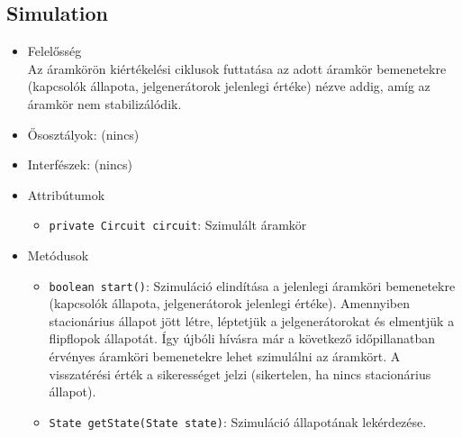 \subsection{Simulation}
\begin{itemize}
\item Felelősség\\
Az áramkörön kiértékelési ciklusok futtatása az adott áramkör bemenetekre (kapcsolók állapota, jelgenerátorok jelenlegi értéke) nézve addig, amíg az áramkör nem stabilizálódik.
\item Ősosztályok: (nincs)
\item Interfészek: (nincs)
\item Attribútumok $\ $
\begin{itemize}
	\item \texttt{private Circuit circuit}: Szimulált áramkör
\end{itemize}
\item Metódusok$\ $
\begin{itemize}
	\item \texttt{boolean start()}: Szimuláció elindítása a jelenlegi áramköri bemenetekre (kapcsolók állapota, jelgenerátorok jelenlegi értéke). Amennyiben stacionárius állapot jött létre, léptetjük a jelgenerátorokat és elmentjük a flipflopok állapotát. Így újbóli hívásra már a következő időpillanatban érvényes áramköri bemenetekre lehet szimulálni az áramkört. A visszatérési érték a sikerességet jelzi (sikertelen, ha nincs stacionárius állapot).
	\item \texttt{State getState(State state)}: Szimuláció állapotának lekérdezése.
\end{itemize}
\end{itemize}

